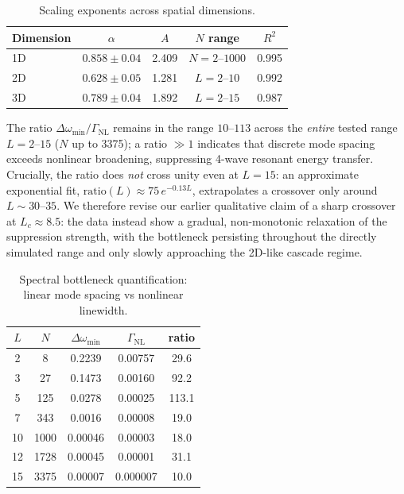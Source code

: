 \documentclass[aps,pre,12pt]{revtex4-2}
\begin{document}
\begin{table}[htbp]
\centering
\caption{Scaling exponents across spatial dimensions.}
\label{tab:alpha}
\begin{tabular}{lcccc}
\toprule
Dimension & $\alpha$ & $A$ & $N$ range & $R^2$ \\
\midrule
1D & $0.858\pm0.04$ & 2.409 & $N=2$--$1000$ & 0.995 \\
2D & $0.628\pm0.05$ & 1.281 & $L=2$--$10$ & 0.992 \\
3D & $0.789\pm0.04$ & 1.892 & $L=2$--$15$ & 0.987 \\
\bottomrule
\end{tabular}
\end{table}

The ratio $\Delta\omega_{\min}/\Gamma_{\text{NL}}$ remains in the range $10$--$113$ across the \emph{entire} tested range $L=2$--$15$ ($N$ up to 3375); a ratio $\gg1$ indicates that discrete mode spacing exceeds nonlinear broadening, suppressing 4-wave resonant energy transfer. Crucially, the ratio does \emph{not} cross unity even at $L=15$: an approximate exponential fit, $\text{ratio}(L)\approx75\,e^{-0.13L}$, extrapolates a crossover only around $L\sim30$--$35$. We therefore revise our earlier qualitative claim of a sharp crossover at $L_c\approx8.5$: the data instead show a gradual, non-monotonic relaxation of the suppression strength, with the bottleneck persisting throughout the directly simulated range and only slowly approaching the 2D-like cascade regime.

\begin{table}[htbp]
\centering
\caption{Spectral bottleneck quantification: linear mode spacing vs nonlinear linewidth.}
\label{tab:bottleneck}
\begin{tabular}{ccccc}
\toprule
$L$ & $N$ & $\Delta\omega_{\min}$ & $\Gamma_{\text{NL}}$ & ratio \\
\midrule
2  & 8    & 0.2239 & 0.00757 & 29.6 \\
3  & 27   & 0.1473 & 0.00160 & 92.2 \\
5  & 125  & 0.0278 & 0.00025 & 113.1 \\
7  & 343  & 0.0016 & 0.00008 & 19.0 \\
10 & 1000 & 0.00046& 0.00003 & 18.0 \\
12 & 1728 & 0.00045& 0.00001 & 31.1 \\
15 & 3375 & 0.00007& 0.000007& 10.0 \\
\bottomrule
\end{tabular}
\end{table}
\end{document}
